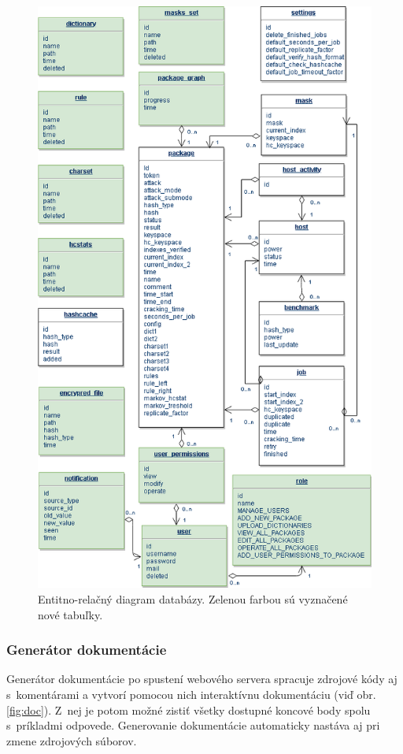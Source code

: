 \documentclass[slovak]{fitthesis}
\begin{document}
\begin{figure}[H]
    \centering
    \includegraphics[scale=0.58]{obrazky/ER.PNG}
    \caption{Entitno-relačný diagram databázy. Zelenou farbou sú vyznačené nové tabuľky.}
    \label{fig:ER}
\end{figure}


\subsubsection{Generátor dokumentácie}
Generátor dokumentácie po spustení webového servera spracuje zdrojové kódy aj s~komentárami a vytvorí pomocou nich interaktívnu dokumentáciu (viď obr. \ref{fig:doc}). Z~nej je potom možné zistiť všetky dostupné koncové body spolu s~príkladmi odpovede. Generovanie dokumentácie automaticky nastáva aj pri zmene zdrojových súborov.
\end{document}
